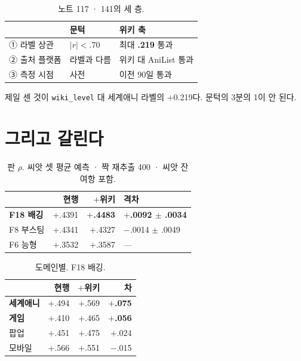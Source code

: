 \documentclass[10pt]{article}
\begin{document}
\begin{table}[t]
\centering\tsize
\caption{노트 117 · 141의 세 층.}
\begin{tabular}{lll}
\toprule
& 문턱 & 위키 축 \\
\midrule
① 라벨 상관 & $|r| < .70$ & 최대 \textbf{.219} 통과 \\
② 출처 플랫폼 & 라벨과 다름 & 위키 대 AniList 통과 \\
③ 측정 시점 & 사전 & 이전 90일 통과 \\
\bottomrule
\end{tabular}
\end{table}

제일 센 것이 \texttt{wiki\_level} 대 세계애니 라벨의 $+$0.219다. 문턱의
3분의 1이 안 된다.

\section{그리고 갈린다}

\begin{table}[t]
\centering\tsize
\caption{판 $\rho$. 씨앗 셋 평균 예측 · 짝 재추출 400 · 씨앗 잔여항 포함.}
\begin{tabular}{lrrl}
\toprule
& 현행 & $+$위키 & 격차 \\
\midrule
\textbf{F18 배깅} & $+$.4391 & \textbf{$+$.4483} &
  \textbf{$+$.0092 $\pm$ .0034} \\
F8 부스팅 & $+$.4341 & $+$.4327 & $-$.0014 $\pm$ .0049 \\
F6 능형 & $+$.3532 & $+$.3587 & --- \\
\bottomrule
\end{tabular}
\end{table}


\begin{table}[t]
\centering\tsize
\caption{도메인별. F18 배깅.}
\begin{tabular}{lrrr}
\toprule
& 현행 & $+$위키 & 차 \\
\midrule
\textbf{세계애니} & $+$.494 & $+$.569 & \textbf{$+$.075} \\
\textbf{게임} & $+$.410 & $+$.465 & \textbf{$+$.056} \\
팝업 & $+$.451 & $+$.475 & $+$.024 \\
모바일 & $+$.566 & $+$.551 & $-$.015 \\
\bottomrule
\end{tabular}
\end{table}
\end{document}
